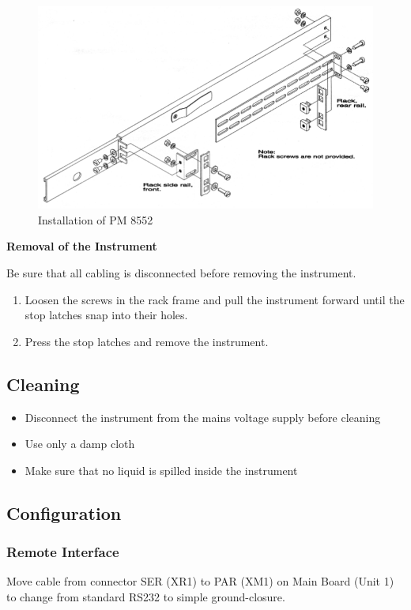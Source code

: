 \begin{figure}[hbt]
\centering
\includegraphics[width=\textwidth]{fig/rack}
\caption{Installation of PM 8552}
\end{figure}

\textbf{Removal of the Instrument}

Be sure that all cabling is disconnected before removing the instrument.
\begin{enumerate}
\item Loosen the screws in the rack frame and pull the instrument forward until the stop latches snap into their holes.
\item Press the stop latches and remove the instrument.
\end{enumerate}

\subsection{Cleaning}
\begin{itemize}
\item Disconnect the instrument from the mains voltage supply before cleaning
\item Use only a damp cloth
\item Make sure that no liquid is spilled inside the instrument
\end{itemize}

\subsection{Configuration}
\subsubsection{Remote Interface}
Move cable from connector SER (XR1) to PAR (XM1) on Main Board (Unit 1) to change from standard RS232 to simple ground-closure.

